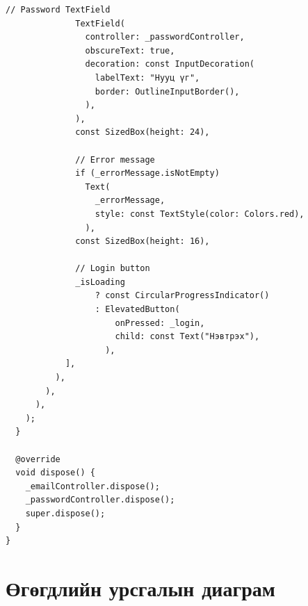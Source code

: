 \begin{lstlisting}[caption={login\_screen.dart -- JWT токены ашиглан нэвтэрх}]
              // Password TextField
              TextField(
                controller: _passwordController,
                obscureText: true,
                decoration: const InputDecoration(
                  labelText: "Нууц үг",
                  border: OutlineInputBorder(),
                ),
              ),
              const SizedBox(height: 24),
              
              // Error message
              if (_errorMessage.isNotEmpty)
                Text(
                  _errorMessage,
                  style: const TextStyle(color: Colors.red),
                ),
              const SizedBox(height: 16),
              
              // Login button
              _isLoading
                  ? const CircularProgressIndicator()
                  : ElevatedButton(
                      onPressed: _login,
                      child: const Text("Нэвтрэх"),
                    ),
            ],
          ),
        ),
      ),
    );
  }

  @override
  void dispose() {
    _emailController.dispose();
    _passwordController.dispose();
    super.dispose();
  }
}
\end{lstlisting}

\section{Өгөгдлийн урсгалын диаграм}

